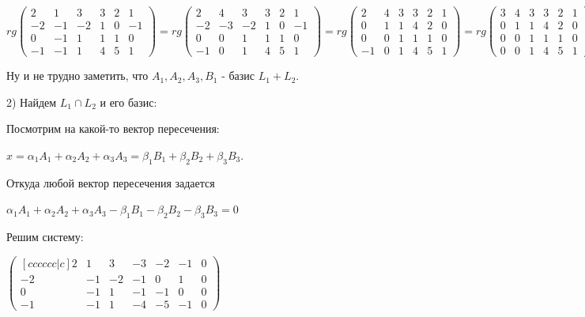 \documentclass{article}
\begin{document}
$rg \begin{pmatrix}
    2 &1 &3 & 3 & 2 &1\\
    -2 & -1 & -2 & 1 & 0 &-1\\
    0 & -1 & 1 & 1 & 1 & 0\\
    -1 & -1 & 1 & 4 & 5 & 1
\end{pmatrix} = rg \begin{pmatrix}
    2 &4 &3 & 3 & 2 &1\\
    -2 & -3 & -2 & 1 & 0 &-1\\
    0 & 0 & 1 & 1 & 1 & 0\\
    -1 & 0 & 1 & 4 & 5 & 1
\end{pmatrix} = rg \begin{pmatrix}
    2 &4 &3 & 3 & 2 &1\\
    0 & 1 & 1 & 4 & 2 &0\\
    0 & 0 & 1 & 1 & 1 & 0\\
    -1 & 0 & 1 & 4 & 5 & 1
\end{pmatrix}= rg \begin{pmatrix}
    3 &4 &3 & 3 & 2 &1\\
    0 & 1 & 1 & 4 & 2 &0\\
    0 & 0 & 1 & 1 & 1 & 0\\
    0 & 0 & 1 & 4 & 5 & 1
\end{pmatrix} = 1 +rg \begin{pmatrix}
 1 & 1 & 4 & 2 &0\\
 0 & 1 & 1 & 1 & 0\\
 0 & 1 & 4 & 5 & 1
\end{pmatrix} = 2 +  rg \begin{pmatrix}
1 & 1 & 1 & 0\\
1 & 4 & 5 & 1
\end{pmatrix} = 4 $

Ну и не трудно заметить, что $A_1,A_2,A_3,B_1$ - базис $L_1+L_2$.

2) {Найдем $L_1\cap L_2$ и его базис:}

Посмотрим на какой-то вектор пересечения: 

$x = \alpha_1 A_1 + \alpha_2 A_2 + \alpha_3 A_3 = \beta_1 B_1 + \beta_2 B_2 + \beta_3 B_3$.

Откуда любой вектор пересечения задается

$\alpha_1 A_1 + \alpha_2 A_2 + \alpha_3 A_3 - \beta_1 B_1 - \beta_2 B_2 - \beta_3 B_3 = 0$

Решим систему:

$\begin{pmatrix}[cccccc|c]
    2 &1 &3 & -3 & -2 &-1 &0\\
    -2 & -1 & -2 & -1 & 0 &1 &0\\
    0 & -1 & 1 & -1 & -1 & 0&0\\
    -1 & -1 & 1 & -4 & -5 & -1&0
\end{pmatrix}$
\end{document}
